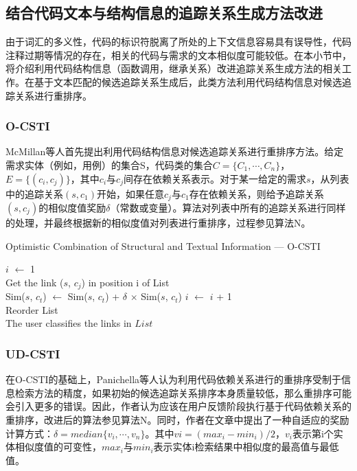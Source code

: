 \subsection{结合代码文本与结构信息的追踪关系生成方法改进}

由于词汇的多义性，代码的标识符脱离了所处的上下文信息容易具有误导性，代码注释过期\cite{anquetil1998assessing}等情况的存在，相关的代码与需求的文本相似度可能较低。在本小节中，将介绍利用代码结构信息（函数调用，继承关系）改进追踪关系生成方法的相关工作\cite{mcmillan2009combining,panichella2013and,scanniello2015link}。在基于文本匹配的候选追踪关系生成后，此类方法利用代码结构信息对候选追踪关系进行重排序。

\subsubsection{O-CSTI}

McMillan等人\cite{mcmillan2009combining}首先提出利用代码结构信息对候选追踪关系进行重排序方法。给定需求实体（例如，用例）的集合S，代码类的集合$C = \{C_{1}, \cdots, C_{n}\}$，$E = \{(c_{i}, c_{j})\}$，其中$c_{i}$与$c_{j}$间存在依赖关系表示。对于某一给定的需求$s$，从列表中的追踪关系$(s, c_{1})$开始，如果任意$c_{j}$与$c_{1}$存在依赖关系，则给予追踪关系$(s, c_{j})$的相似度值奖励$\delta$（常数或变量）。算法对列表中所有的追踪关系进行同样的处理，并最终根据新的相似度值对列表进行重排序，过程参见算法N。

\begin{algorithm}[htbp]
\caption{Optimistic Combination of Structural and Textual Information — O-CSTI}
\label{alg:O_CSTI}
    $i$ $\leftarrow$ 1\\
    {
      Get the link ($s$, $c_{j}$) in position i of List\\
       {
         {
          Sim($s$, $c_{t}$) $\leftarrow$ Sim($s$, $c_{t}$) + $\delta$ $\times$ Sim($s$, $c_{t}$)
        }
      }
      $i$ $\leftarrow$ $i$ + 1\\
    }
    Reorder List\\
    The user classifies the links in $List$
\end{algorithm}

\subsubsection{UD-CSTI}

在O-CSTI的基础上，Panichella等人\cite{panichella2013and}认为利用代码依赖关系进行的重排序受制于信息检索方法的精度，如果初始的候选追踪关系排序本身质量较低，那么重排序可能会引入更多的错误。因此，作者认为应该在用户反馈阶段执行基于代码依赖关系的重排序，改进后的算法参见算法N。同时，作者在文章中提出了一种自适应的奖励计算方式：$\delta = median\{v_{i}, \cdots, v_{n}\}$。其中$vi = (max_{i} - min_{i}) / 2$，$v_{i}$表示第i个实体相似度值的可变性，$max_{i}$与$min_{i}$表示实体i检索结果中相似度的最高值与最低值。

